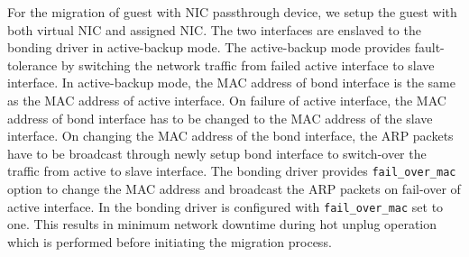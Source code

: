 
For the migration of guest with NIC passthrough device, we setup the 
guest with both virtual NIC and assigned NIC. The two interfaces 
are enslaved to the bonding driver in active-backup mode. The 
active-backup mode provides fault-tolerance by switching the
network traffic from failed active interface to slave interface.
In active-backup mode, the MAC address of bond interface 
is the same as the MAC address of active interface. On failure 
of active interface, the MAC address of bond interface has to 
be changed to the MAC address of the slave interface. On changing
the MAC address of the bond interface, the ARP packets have to be
broadcast through newly setup bond interface to switch-over the
traffic from active to slave interface. The bonding driver 
provides \texttt{fail\_over\_mac} option to change 
the MAC address and broadcast the ARP packets on fail-over of
active interface. In \na the bonding driver is configured 
with \texttt{fail\_over\_mac} set to one. This results in minimum
network downtime during hot unplug operation which is performed
before initiating the migration process.

 

